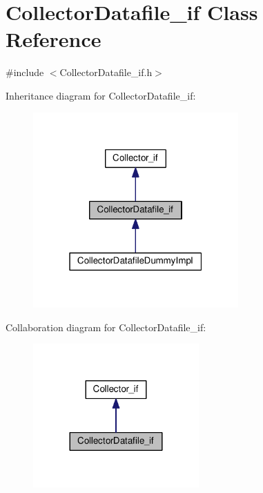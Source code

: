 \hypertarget{class_collector_datafile__if}{}\section{Collector\+Datafile\+\_\+if Class Reference}
\label{class_collector_datafile__if}


{\ttfamily \#include $<$Collector\+Datafile\+\_\+if.\+h$>$}



Inheritance diagram for Collector\+Datafile\+\_\+if\+:
\nopagebreak
\begin{figure}[H]
\begin{center}
\leavevmode
\includegraphics[width=223pt]{class_collector_datafile__if__inherit__graph}
\end{center}
\end{figure}


Collaboration diagram for Collector\+Datafile\+\_\+if\+:
\nopagebreak
\begin{figure}[H]
\begin{center}
\leavevmode
\includegraphics[width=180pt]{class_collector_datafile__if__coll__graph}
\end{center}
\end{figure}
